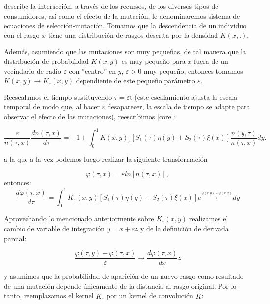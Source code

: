 describe la interacción, a través de los recursos, de los diversos tipos de consumidores, así como el efecto de la mutación, le denominaremos sistema de ecuaciones de selección-mutación. Tomamos que la descendencia de un individuo con el rasgo $x$ tiene una distribución de rasgos descrita por la densidad $K(x,.)$.

Además, asumiendo que las mutaciones son muy pequeñas, de tal manera que la distribución de probabilidad $K(x,y)$ es muy pequeño para $x$ fuera de un vecindario de radio $\varepsilon$ con ''centro'' en $y$, $\varepsilon>0$ muy pequeño, entonces tomamos $K(x,y)\to K_{\varepsilon}(x,y)$ dependiente de este pequeño parámetro $\varepsilon$.\citep{dieckman2005}

Reescalamos el tiempo sustituyendo $\tau=\varepsilon$t (este escalamiento ajusta la escala temporal de modo que, al hacer $\varepsilon$ desaparecer, la escala de tiempo se adapte para observar el efecto de las mutaciones), reescribimos \eqref{core}:

\begin{equation}\label{nocon}
	\frac{\varepsilon}{n(\tau,x)}\frac{d n(\tau,x)}{d\tau}=-1+\int_{0}^{1}K(x,y)_{\varepsilon}[S_1(\tau)\eta(y)+S_2(\tau)\xi(x)]\frac{n(y,\tau)}{n(\tau,x)}dy.
\end{equation}

a la que a la vez podemos luego realizar la siguiente transformación

\begin{equation*}
	\varphi(\tau,x)=\varepsilon ln[n(\tau,x)],
\end{equation*}
entonces:
\begin{equation*}
	\frac{d\varphi(\tau,x) }{d\tau}=\int_{0}^{1}K_{\varepsilon}(x,y)[S_1(\tau)\eta(y)+S_2(\tau)\xi(x)]e^{\frac{\varphi(\tau,y)-\varphi(\tau,x)}{\varepsilon}}dy
\end{equation*}

Aprovechando lo mencionado anteriormente sobre $K_{\varepsilon}(x,y)$ realizamos el cambio de variable de integración $y=x+\varepsilon z$ y de la definición de derivada parcial:

\begin{equation*}
	\frac{\varphi(\tau,y)-\varphi(\tau,x)}{\varepsilon} \to \frac{d\varphi(\tau,x) }{dx}z
\end{equation*}

y asumimos que la probabilidad de aparición de un nuevo rasgo como resultado de una mutación depende únicamente de la distancia al rasgo original. Por lo tanto, reemplazamos el kernel $K_{\varepsilon}$ por un kernel de convolución $\widetilde{K}$:


